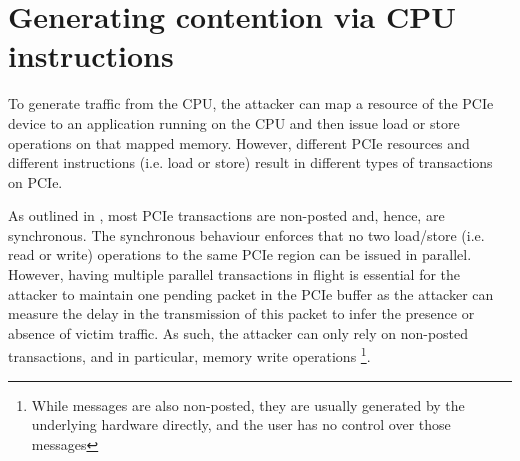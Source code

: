 \section{Generating contention via CPU instructions}
\label{sec:interconnect-sc-store-ops}

To generate traffic from the CPU, the attacker can map a resource of the PCIe device to an application running on the CPU and then issue load or store operations on that mapped memory.
However, different PCIe resources and different instructions (i.e. load or store) result in different types of transactions on PCIe.

As outlined in , most PCIe transactions are non-posted and, hence, are synchronous.
The synchronous behaviour enforces that no two load/store (i.e. read or write) operations to the same PCIe region can be issued in parallel.
However, having multiple parallel transactions in flight is essential for the attacker to maintain one pending packet in the PCIe buffer as the attacker can measure the delay in the transmission of this packet to infer the presence or absence of victim traffic. 
As such, the attacker can only rely on non-posted transactions, and in particular, memory write operations
\footnote{While messages are also non-posted, they are usually generated by the underlying hardware directly, and the user has no control over those messages}.







\endinput
